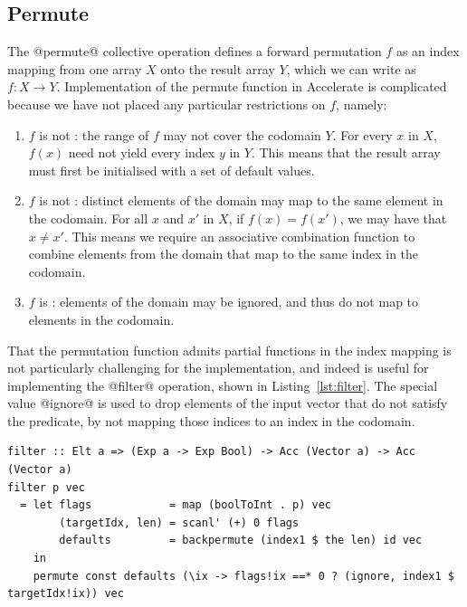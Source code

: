 \subsection{Permute}
\label{sec:parallel_permute}

The @permute@ collective operation defines a forward permutation $f$ as an
index mapping from one array $X$ onto the result array $Y$, which we can write
as  $f : X \rightarrow Y$. Implementation of the permute function in Accelerate
is complicated because we have not placed any particular restrictions on $f$,
namely:
%
\begin{enumerate}
    \item $f$ is not : the range of $f$ may not cover the
        codomain $Y$. For every $x$ in $X$, $f\left( x \right)$ need not yield
        every index $y$ in $Y$. This means that the result array must first be
        initialised with a set of default values.

    \item $f$ is not : distinct elements of the domain may map
        to the same element in the codomain. For all $x$ and $x'$ in $X$, if
        $f\left( x \right) = f\left( x' \right)$, we may have that $x \ne x'$.
        This means we require an associative combination function to combine
        elements from the domain that map to the same index in the codomain.

    \item $f$ is : elements of the domain may be ignored, and
        thus do not map to elements in the codomain.
\end{enumerate}

That the permutation function admits partial functions in the index mapping is
not particularly challenging for the implementation, and indeed is useful for
implementing the @filter@ operation, shown in Listing~\ref{lst:filter}. The
special value @ignore@ is used to drop elements of the input vector that do not
satisfy the predicate, by not mapping those indices to an index in the codomain.
%
\begin{lstlisting}[style=haskell_float
    ,label=lst:filter
    ,caption={[Filtering a vector based on a predicate] Filtering returns only
    those elements of a vector which satisfy a predicate. This operation is
    included as part of Accelerate's standard prelude.}]
filter :: Elt a => (Exp a -> Exp Bool) -> Acc (Vector a) -> Acc (Vector a)
filter p vec
  = let flags            = map (boolToInt . p) vec
        (targetIdx, len) = scanl' (+) 0 flags
        defaults         = backpermute (index1 $ the len) id vec
    in
    permute const defaults (\ix -> flags!ix ==* 0 ? (ignore, index1 $ targetIdx!ix)) vec
\end{lstlisting}


